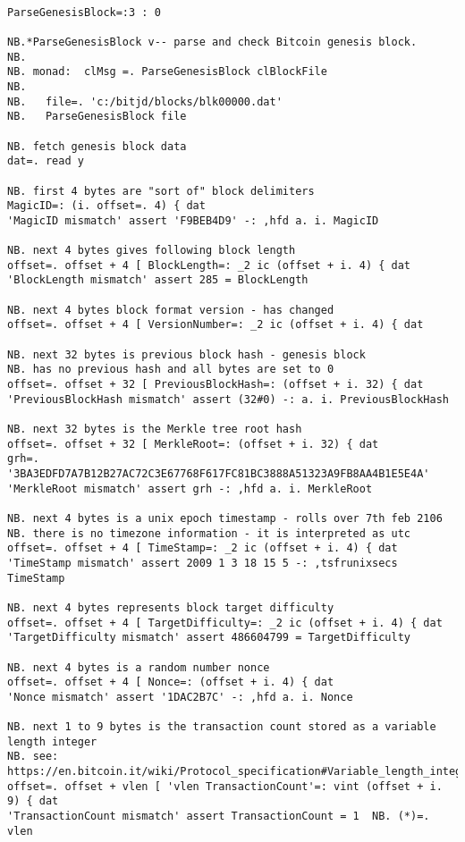 \newpage
\begin{tcolorbox}[breakable, size=fbox, boxrule=1pt, pad at break*=1mm,colback=cellbackground, colframe=cellborder]
\begin{lstlisting}[language=jdoc, frame=single,framerule=0pt,label=lst:scr4754X0]

ParseGenesisBlock=:3 : 0

NB.*ParseGenesisBlock v-- parse and check Bitcoin genesis block.
NB.
NB. monad:  clMsg =. ParseGenesisBlock clBlockFile
NB.
NB.   file=. 'c:/bitjd/blocks/blk00000.dat'
NB.   ParseGenesisBlock file

NB. fetch genesis block data
dat=. read y

NB. first 4 bytes are "sort of" block delimiters
MagicID=: (i. offset=. 4) { dat
'MagicID mismatch' assert 'F9BEB4D9' -: ,hfd a. i. MagicID

NB. next 4 bytes gives following block length
offset=. offset + 4 [ BlockLength=: _2 ic (offset + i. 4) { dat
'BlockLength mismatch' assert 285 = BlockLength

NB. next 4 bytes block format version - has changed
offset=. offset + 4 [ VersionNumber=: _2 ic (offset + i. 4) { dat

NB. next 32 bytes is previous block hash - genesis block
NB. has no previous hash and all bytes are set to 0
offset=. offset + 32 [ PreviousBlockHash=: (offset + i. 32) { dat
'PreviousBlockHash mismatch' assert (32#0) -: a. i. PreviousBlockHash

NB. next 32 bytes is the Merkle tree root hash
offset=. offset + 32 [ MerkleRoot=: (offset + i. 32) { dat
grh=. '3BA3EDFD7A7B12B27AC72C3E67768F617FC81BC3888A51323A9FB8AA4B1E5E4A'
'MerkleRoot mismatch' assert grh -: ,hfd a. i. MerkleRoot

NB. next 4 bytes is a unix epoch timestamp - rolls over 7th feb 2106
NB. there is no timezone information - it is interpreted as utc
offset=. offset + 4 [ TimeStamp=: _2 ic (offset + i. 4) { dat
'TimeStamp mismatch' assert 2009 1 3 18 15 5 -: ,tsfrunixsecs TimeStamp

NB. next 4 bytes represents block target difficulty
offset=. offset + 4 [ TargetDifficulty=: _2 ic (offset + i. 4) { dat
'TargetDifficulty mismatch' assert 486604799 = TargetDifficulty

NB. next 4 bytes is a random number nonce
offset=. offset + 4 [ Nonce=: (offset + i. 4) { dat
'Nonce mismatch' assert '1DAC2B7C' -: ,hfd a. i. Nonce

NB. next 1 to 9 bytes is the transaction count stored as a variable length integer
NB. see:  https://en.bitcoin.it/wiki/Protocol_specification#Variable_length_integer
offset=. offset + vlen [ 'vlen TransactionCount'=: vint (offset + i. 9) { dat
'TransactionCount mismatch' assert TransactionCount = 1  NB. (*)=. vlen


\end{lstlisting}
\end{tcolorbox}
